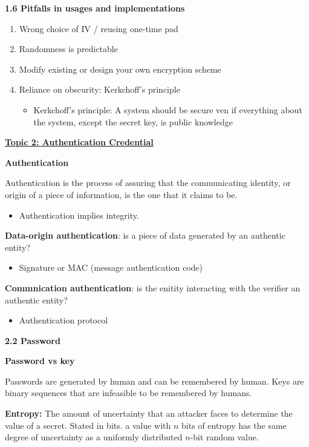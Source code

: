 \documentclass[landscape,a4paper]{extarticle}
\begin{document}
\begin{multicols*}{5}
    \textbf{1.6 Pitfalls in usages and implementations}
    \begin{enumerate}
        \item Wrong choice of IV / reusing one-time pad
        \item Randomness is predictable
        \item Modify existing or design your own encryption scheme
        \item Reliance on obscurity: Kerkchoff's principle
        \begin{itemize}
            \item Kerkchoff's principle: A system should be secure ven if everything about the
            system, except the secret key, is public knowledge
        \end{itemize}
    \end{enumerate}

    \textbf{\uline{Topic 2: Authentication Credential}}

    \textbf{Authentication}

    Authentication is the process of assuring that the communicating identity, or origin of a
    piece of information, is the one that it claims to be.

    \begin{itemize}
        \item Authentication implies integrity.
    \end{itemize}

    \textbf{Data-origin authentication}: is a piece of data generated by an authentic entity?
    \begin{itemize}
        \item Signature or MAC (message authentication code)
    \end{itemize}

    \textbf{Commnication authentication}: is the enitity interacting with the verifier an authentic entity?
    \begin{itemize}
        \item Authentication protocol
    \end{itemize}

    \textbf{2.2 Password}

    \textbf{Password vs key}

    Passwords are generated by human and can be remembered by human. Keys are binary sequences that are infeasible to be 
    remembered by humans.

    \textbf{Entropy:} The amount of uncertainty that an attacker faces to determine the value of a secret. 
    Stated in bits. a value with $n$ bits of entropy has the same degree of uncertainty as a uniformly distributed $n$-bit
    random value.


\end{multicols*}
\end{document}

